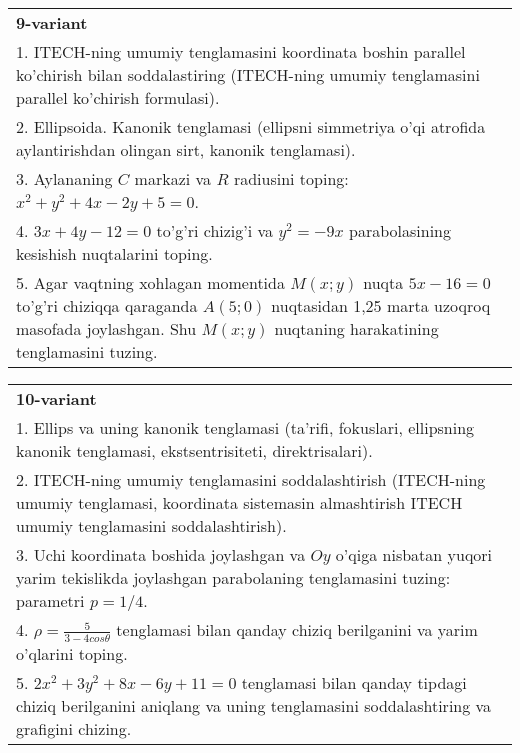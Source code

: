 \documentclass{article}
\begin{document}
\begin{tabular}{m{17cm}}
\textbf{9-variant}\\
1. ITECH-ning umumiy tenglamasini koordinata boshin parallel ko'chirish bilan soddalastiring (ITECH-ning umumiy tenglamasini parallel ko'chirish formulasi).\\

2. Ellipsoida. Kanonik tenglamasi (ellipsni simmetriya o'qi atrofida aylantirishdan olingan sirt, kanonik tenglamasi).\\

3. Aylananing $C$ markazi va $R$ radiusini toping: $x^2+y^2+4x-2y+5=0$.\\

4. $3x + 4y - 12 = 0$ to'g'ri chizig'i va $y^{2} = - 9x$ parabolasining kesishish nuqtalarini toping.\\

5. Agar vaqtning xohlagan momentida $M(x;y)$ nuqta $5x - 16 = 0$ to'g'ri chiziqqa qaraganda $A(5;0)$ nuqtasidan 1,25 marta uzoqroq masofada joylashgan. Shu $M(x;y)$ nuqtaning harakatining tenglamasini tuzing.  
\end{tabular}
\vspace{1cm}


\begin{tabular}{m{17cm}}
\textbf{10-variant}\\
1. Ellips va uning kanonik tenglamasi (ta'rifi, fokuslari, ellipsning kanonik tenglamasi, ekstsentrisiteti, direktrisalari).\\

2. ITECH-ning umumiy tenglamasini soddalashtirish (ITECH-ning umumiy tenglamasi, koordinata sistemasin almashtirish ITECH umumiy tenglamasini soddalashtirish).\\

3. Uchi koordinata boshida joylashgan va $Oy$ o'qiga nisbatan yuqori yarim tekislikda joylashgan parabolaning tenglamasini tuzing: parametri $p=1/4$.\\

4. $\rho = \frac{5}{3 - 4cos\theta}$ tenglamasi bilan qanday chiziq berilganini va yarim o'qlarini toping.  \\

5. $2x^{2} + 3y^{2} + 8x - 6y + 11 = 0$ tenglamasi bilan qanday tipdagi chiziq berilganini aniqlang va uning tenglamasini soddalashtiring va grafigini chizing.  
\end{tabular}
\vspace{1cm}
\end{document}
